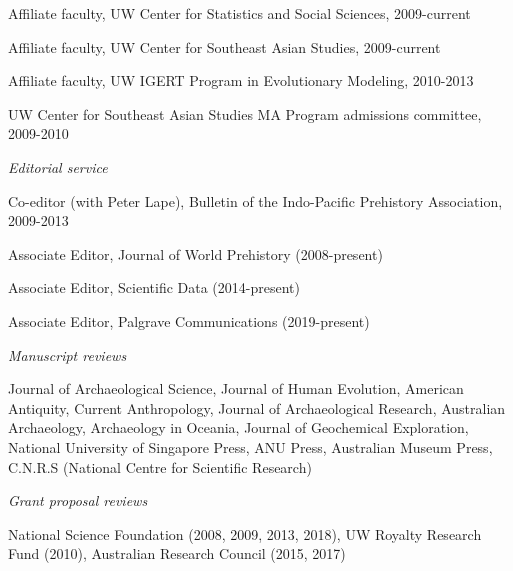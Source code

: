 \ind Affiliate faculty, UW Center for Statistics and Social Sciences, 2009-current

\ind Affiliate faculty, UW Center for Southeast Asian Studies, 2009-current

\ind Affiliate faculty, UW IGERT Program in Evolutionary Modeling, 2010-2013

\ind UW Center for Southeast Asian Studies MA Program admissions committee, 2009-2010



\medskip

\noindent\emph{Editorial service\vspace{0.01in}}

\medskip

\ind Co-editor (with Peter Lape), Bulletin of the Indo-Pacific Prehistory Association, 2009-2013

\ind Associate Editor, Journal of World Prehistory (2008-present)

\ind Associate Editor, Scientific Data (2014-present)

\ind Associate Editor, Palgrave Communications (2019-present)

\vspace{0.05in}

\noindent\emph{Manuscript reviews\vspace{0.01in}}

\medskip

\noindent Journal of Archaeological Science, Journal of Human Evolution, American Antiquity, Current Anthropology, Journal of Archaeological Research, Australian Archaeology, Archaeology in Oceania, Journal of Geochemical Exploration, National University of Singapore Press, ANU Press, Australian Museum Press, C.N.R.S (National Centre for Scientific Research)

 \vspace{0.05in}
 \medskip

\noindent\emph{Grant proposal reviews\vspace{0.01in}}

\medskip

\noindent National Science Foundation (2008, 2009, 2013, 2018), UW Royalty Research Fund (2010), Australian Research Council (2015, 2017)
